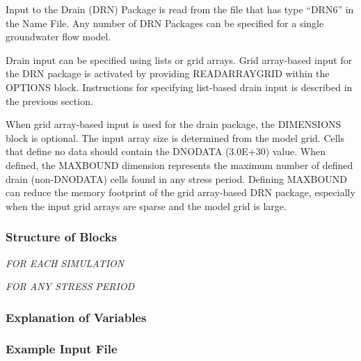 Input to the Drain (DRN) Package is read from the file that has type ``DRN6'' in the Name File.  Any number of DRN Packages can be specified for a single groundwater flow model.

Drain input can be specified using lists or grid arrays.  Grid array-based input for the DRN package is activated by providing READARRAYGRID within the OPTIONS block.  Instructions for specifying list-based drain input is described in the previous section.

When grid array-based input is used for the drain package, the DIMENSIONS block is optional.  The input array size is determined from the model grid.  Cells that define no data should contain the DNODATA (3.0E+30) value.  When defined, the MAXBOUND dimension represents the maximum number of defined drain (non-DNODATA) cells found in any stress period.  Defining MAXBOUND can reduce the memory footprint of the grid array-based DRN package, especially when the input grid arrays are sparse and the model grid is large.

\vspace{5mm}
\subsubsection{Structure of Blocks}
\vspace{5mm}

\noindent \textit{FOR EACH SIMULATION}


\vspace{5mm}
\noindent \textit{FOR ANY STRESS PERIOD}

\packageperioddescription

\vspace{5mm}
\subsubsection{Explanation of Variables}
\begin{description}

\end{description}

\vspace{5mm}
\subsubsection{Example Input File}


